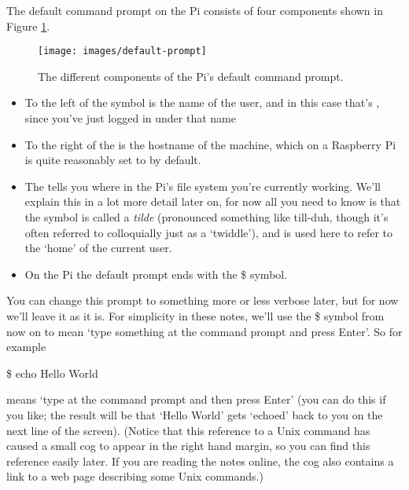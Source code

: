 The default command prompt on the Pi consists of four components shown in Figure \ref{figure:prompt}.

\begin{figure}
\centerline{\texttt{[image: images/default-prompt]}}
\caption{The different components of the Pi's default command prompt.}\label{figure:prompt}
\end{figure}


\begin{itemize}
\item To the left of the  symbol is the name of the user, and in this case that's , since you've just logged in under that name
\item To the right of the  is the hostname of the machine, which on a Raspberry Pi is quite reasonably set to  by default.
\item The \texttildelow{} tells you where in the Pi's file system you're currently working. We'll explain this in a lot more detail later on, for now all you need to know is that the \texttildelow{} symbol is called a \textit{tilde} (pronounced something like till-duh, though it's often referred to colloquially just as a `twiddle'), and is used here to refer to the `home' of the current user.
\item On the Pi the default prompt ends with the \$ symbol.
\end{itemize}

You can change this prompt to something more or less verbose later, but for now we'll leave it as it is. For simplicity in these notes, we'll use the \$ symbol from now on to mean `type something at the command prompt and press Enter'. So for example

\begin{ttoutenv}
\$ echo Hello World
\end{ttoutenv}

\noindent means `type  at the command prompt and then press Enter' (you can do this if you like; the result will be that `Hello World' gets `echoed'  back to you on the next line of the screen). (Notice that this reference to a Unix command has caused a small cog to appear in the right hand margin, so you can find this reference easily later. If you are reading the notes online, the cog also contains a link to a web page describing some Unix commands.)

